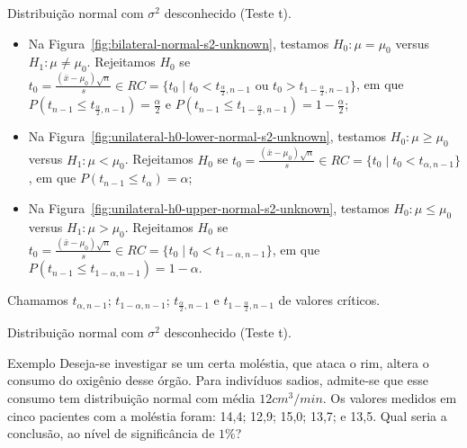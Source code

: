 \documentclass[8pt]{beamer}
\begin{document}
\begin{frame}{Distribuição normal com $\sigma^2$ desconhecido (Teste t).}

\large
\begin{itemize}
	\item Na Figura~\ref{fig:bilateral-normal-s2-unknown}, testamos $H_0: \mu = \mu_0$ versus $H_1: \mu \neq \mu_0$. Rejeitamos $H_0$ se $t_0 = \frac{(\bar{x} - \mu_0)\sqrt{n}}{s} \in \allowbreak RC=\{t_0 \mid t_0 < t_{\frac{\alpha}{2}, n-1} \mbox{ ou } t_0 > t_{1-\frac{\alpha}{2}, n-1} \}$, em que $P\left(t_{n-1} \leq t_{\frac{\alpha}{2}, n-1} \right) = \frac{\alpha}{2}$ e $P\left(t_{n-1} \leq t_{1-\frac{\alpha}{2}, n-1} \right) = 1- \frac{\alpha}{2}$;
	\vfill
	
	\item Na Figura~\ref{fig:unilateral-h0-lower-normal-s2-unknown}, testamos $H_0: \mu \geq \mu_0$ versus $H_1: \mu < \mu_0$. Rejeitamos $H_0$ se $t_0 = \frac{(\bar{x} - \mu_0)\sqrt{n}}{s} \in \allowbreak RC=\{t_0 \mid t_0 < t_{\alpha, n-1}  \}$, em que $P\left(t_{n-1} \leq t_{\alpha} \right) =\alpha$;
	\vfill
	
	\item Na Figura~\ref{fig:unilateral-h0-upper-normal-s2-unknown}, testamos $H_0: \mu \leq \mu_0$ versus $H_1: \mu > \mu_0$. Rejeitamos $H_0$ se $t_0 = \frac{(\bar{x} - \mu_0)\sqrt{n}}{s} \in \allowbreak RC=\{t_0 \mid t_0 < t_{1-\alpha, n-1}  \}$, em que $P\left(t_{n-1} \leq t_{1-\alpha, n-1} \right) = 1-\alpha$.
\end{itemize}
Chamamos $t_{\alpha, n-1}$; $t_{1-\alpha, n-1}$; $t_{\frac{\alpha}{2}, n-1}$ e $t_{1-\frac{\alpha}{2}, n-1}$ de valores críticos.
\normalsize
\end{frame}

\begin{frame}{Distribuição normal com $\sigma^2$ desconhecido (Teste t).}

\large
\begin{block}{Exemplo}
	Deseja-se investigar se um certa moléstia, que ataca o rim, altera o consumo do oxigênio desse órgão. Para indivíduos sadios, admite-se que esse consumo tem distribuição normal com média $12cm^3/min$.
	Os valores medidos em cinco pacientes com a moléstia foram: 14,4; 12,9; 15,0; 13,7; e 13,5. Qual seria a conclusão, ao nível de significância de $1\%$?
\end{block}

\normalsize
\end{frame}
\end{document}
